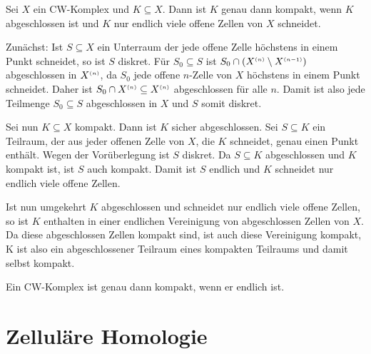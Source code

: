 \begin{lemma}[{name=[Kompaktheit von Teilmengen eines CW-Komplexes]},label=lem:116]
	Sei $X$ ein CW-Komplex und $K \subseteq X$. 
	Dann ist $K$ genau dann kompakt, wenn $K$ abgeschlossen ist und $K$ nur endlich viele offene Zellen von $X$ schneidet.
\end{lemma}
\begin{beweis}
	Zunächst: Ist $S \subseteq X$ ein Unterraum der jede offene Zelle höchstens in einem Punkt schneidet, so ist $S$ diskret. 
	Für $S_0 \subseteq S$ ist $S_0 \cap (X^{\scriptscriptstyle(n)} \setminus X^{\scriptscriptstyle(n-1)})$ abgeschlossen in $X^{\scriptscriptstyle(n)}$, da $S_0$ jede offene $n$-Zelle von $X$ höchstens in einem Punkt schneidet.  
	Daher ist $S_0 \cap X^{\scriptscriptstyle(n)} \subseteq X^{\scriptscriptstyle(n)}$ abgeschlossen für alle $n$. 
	Damit ist also jede Teilmenge $S_0 \subseteq S$ abgeschlossen in $X$ und $S$ somit diskret.

	Sei nun $K \subseteq X$ kompakt. Dann ist $K$ sicher abgeschlossen. 
	Sei $S \subseteq K$ ein Teilraum, der aus jeder offenen Zelle von $X$, die $K$ schneidet, genau einen Punkt enthält. 
	Wegen der Vorüberlegung ist $S$ diskret. 
	Da $S \subseteq K$ abgeschlossen und $K$ kompakt ist, ist $S$ auch kompakt. 
	Damit ist $S$ endlich und $K$ schneidet nur endlich viele offene Zellen.

	Ist nun umgekehrt $K$ abgeschlossen und schneidet nur endlich viele offene Zellen, so ist $K$ enthalten in einer endlichen Vereinigung von abgeschlossen Zellen von $X$.
	Da diese abgeschlossen Zellen kompakt sind, ist auch diese Vereinigung kompakt, K ist also ein abgeschlossener Teilraum eines kompakten Teilraums und damit selbst kompakt.
\end{beweis}

\begin{korollarB}[{name=[{ein CW-Komplex ist genau dann kompakt, wenn er endlich ist}]}]
	Ein CW-Komplex ist genau dann kompakt, wenn er endlich ist.
\end{korollarB}

\newpage

\section{Zelluläre Homologie} %
\label{sec:12}

